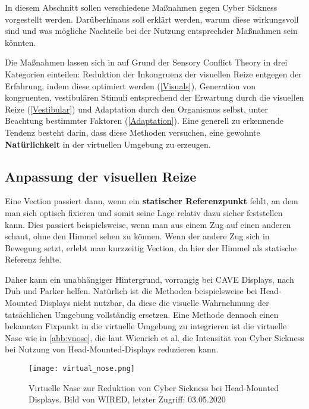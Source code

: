 In diesem Abschnitt sollen verschiedene Ma{\ss}nahmen gegen Cyber Sickness vorgestellt werden. Dar\"uberhinaus soll erkl\"art werden, warum diese wirkungsvoll sind und was m\"ogliche Nachteile bei der Nutzung entsprechder Ma{\ss}nahmen sein k\"onnten.

Die Ma{\ss}nahmen lassen sich in auf Grund der Sensory Conflict Theory in drei Kategorien einteilen: 
Reduktion der Inkongruenz der visuellen Reize entgegen der Erfahrung, indem diese optimiert werden (\autoref{Visuals}), Generation von kongruenten, vestibul\"aren Stimuli entsprechend der Erwartung durch die visuellen Reize (\autoref{Vestibular}) und Adaptation durch den Organismus selbst, unter Beachtung bestimmter Faktoren (\autoref{Adaptation}). Eine generell zu erkennende Tendenz besteht darin, dass diese Methoden versuchen, eine gewohnte \textbf{Nat\"urlichkeit} in der virtuellen Umgebung zu erzeugen.

\subsection{Anpassung der visuellen Reize}\label{Visuals}
Eine Vection passiert dann, wenn ein \textbf{statischer Referenzpunkt} fehlt, an dem man sich optisch fixieren und somit seine Lage relativ dazu sicher feststellen kann. Dies passiert beispielsweise, wenn man aus einem Zug auf einen anderen schaut, ohne den Himmel sehen zu k\"onnen. Wenn der andere Zug sich in Bewegung setzt, erlebt man kurzzeitig Vection, da hier der Himmel als statische Referenz fehlte.

Daher kann ein unabh\"angiger Hintergrund, vorrangig bei CAVE Displays, nach Duh und Parker \cite{Duh:2001:Static} helfen. Nat\"urlich ist die Methoden beispielsweise bei Head-Mounted Displays nicht nutzbar, da diese die visuelle Wahrnehmung der tats\"achlichen Umgebung vollst\"andig ersetzen. Eine Methode dennoch einen bekannten Fixpunkt in die virtuelle Umgebung zu integrieren ist die virtuelle Nase wie in \autoref{abb:vnose}, die laut Wienrich et al.\cite{Wienrich:2018:Nose} die Intensit\"at von Cyber Sickness bei Nutzung von Head-Mounted-Displays reduzieren kann.


\begin{figure}[tbh]
	\centering 
	\texttt{[image: virtual\_nose.png]}
	\caption{Virtuelle Nase zur Reduktion von Cyber Sickness bei Head-Mounted Displays. Bild von WIRED\cite{WIRED:2020:Nose}, letzter Zugriff: 03.05.2020}
	\label{abb:vnose}
\end{figure}


